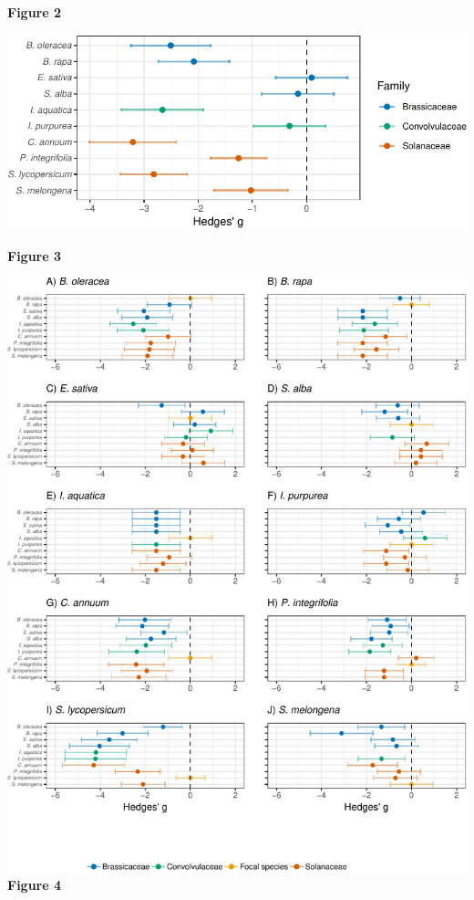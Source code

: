 \documentclass[]{article}
\begin{document}
\textbf{Figure 2}

\newpage

\begin{center}\includegraphics{output/figures/unnamed-chunk-5-1} \end{center}

\textbf{Figure 3}

\newpage

\includegraphics{output/figures/unnamed-chunk-6-1.pdf} \textbf{Figure 4}
\end{document}
